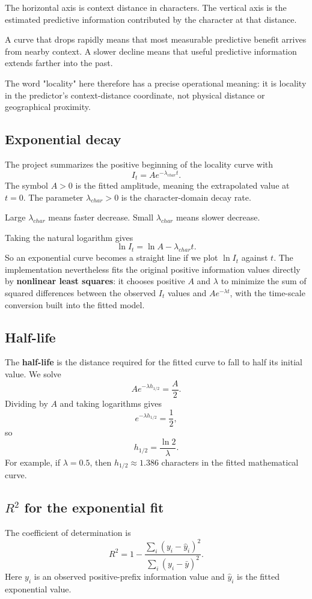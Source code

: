 \documentclass[11pt]{article}
\begin{document}
The horizontal axis is context distance in characters. The vertical axis is the estimated predictive information contributed by the character at that distance.

A curve that drops rapidly means that most measurable predictive benefit arrives from nearby context. A slower decline means that useful predictive information extends farther into the past.

The word "locality" here therefore has a precise operational meaning: it is locality in the predictor's context-distance coordinate, not physical distance or geographical proximity.

\subsection{Exponential decay}
The project summarizes the positive beginning of the locality curve with
\[
\boxed{I_t=Ae^{-\lambda_{char}t}.}
\]
The symbol $A>0$ is the fitted amplitude, meaning the extrapolated value at $t=0$. The parameter $\lambda_{char}>0$ is the character-domain decay rate.

Large $\lambda_{char}$ means faster decrease. Small $\lambda_{char}$ means slower decrease.

Taking the natural logarithm gives
\[
\ln I_t=\ln A-\lambda_{char}t.
\]
So an exponential curve becomes a straight line if we plot $\ln I_t$ against $t$. The implementation nevertheless fits the original positive information values directly by \textbf{nonlinear least squares}: it chooses positive $A$ and $\lambda$ to minimize the sum of squared differences between the observed $I_t$ values and $Ae^{-\lambda t}$, with the time-scale conversion built into the fitted model.

\subsection{Half-life}
The \textbf{half-life} is the distance required for the fitted curve to fall to half its initial value. We solve
\[
Ae^{-\lambda h_{1/2}}=\frac A2.
\]
Dividing by $A$ and taking logarithms gives
\[
e^{-\lambda h_{1/2}}=\frac12,
\]
so
\[
\boxed{h_{1/2}=\frac{\ln2}{\lambda}.}
\]
For example, if $\lambda=0.5$, then $h_{1/2}\approx1.386$ characters in the fitted mathematical curve.

\subsection{$R^2$ for the exponential fit}
The coefficient of determination is
\[
R^2=1-\frac{\sum_i(y_i-\hat y_i)^2}{\sum_i(y_i-\bar y)^2}.
\]
Here $y_i$ is an observed positive-prefix information value and $\hat y_i$ is the fitted exponential value.
\end{document}
